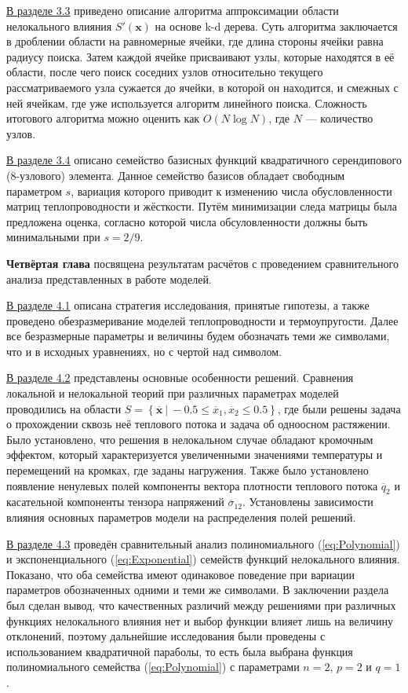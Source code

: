 \underline{В разделе 3.3} приведено описание алгоритма аппроксимации области нелокального влияния $S'(\boldsymbol{x})$ на основе k-d дерева. Суть алгоритма заключается в дроблении области на равномерные ячейки, где длина стороны ячейки равна радиусу поиска. Затем каждой ячейке присваивают узлы, которые находятся в её области, после чего поиск соседних узлов относительно текущего рассматриваемого узла сужается до ячейки, в которой он находится, и смежных с ней ячейкам, где уже используется алгоритм линейного поиска. Сложность итогового алгоритма можно оценить как $O(N \log N)$, где $N$ --- количество узлов.

\underline{В разделе 3.4} описано семейство базисных функций квадратичного серендипового (8-узлового) элемента. Данное семейство базисов обладает свободным параметром $s$, вариация которого приводит к изменению числа обусловленности матриц теплопроводности и жёсткости. Путём минимизации следа матрицы была предложена оценка, согласно которой числа обсуловленности должны быть минимальными при $s = 2/9$.

\textbf{Четвёртая глава} посвящена результатам расчётов с проведением сравнительного анализа представленных в работе моделей.

\underline{В разделе 4.1} описана стратегия исследования, принятые гипотезы, а также проведено обезразмеривание моделей теплопроводности и термоупругости. Далее все безразмерные параметры и величины будем обозначать теми же символами, что и в исходных уравнениях, но с чертой над символом.

\underline{В разделе 4.2} представлены основные особенности решений. Сравнения локальной и нелокальной теорий при различных параметрах моделей проводились на области $S = \left\{ \overline{\boldsymbol{x}} \ | \ -0.5 \leqslant \overline{x}_1, \overline{x}_2 \leqslant 0.5 \right\}$, где были решены задача о прохождении сквозь неё теплового потока и задача об одноосном растяжении. Было установлено, что решения в нелокальном случае обладают кромочным эффектом, который характеризуется увеличенными значениями температуры и перемещений на кромках, где заданы нагружения. Также было установлено появление ненулевых полей компоненты вектора плотности теплового потока $\overline{q}_2$ и касательной компоненты тензора напряжений $\overline{\sigma}_{12}$. Установлены зависимости влияния основных параметров модели на распределения полей решений.

\underline{В разделе 4.3} проведён сравнительный анализ полиномиального (\ref{eq:Polynomial}) и экспоненциального (\ref{eq:Exponential}) семейств функций нелокального влияния. Показано, что оба семейства имеют одинаковое поведение при вариации параметров обозначенных одними и теми же символами. В заключении раздела был сделан вывод, что качественных различий между решениями при различных функциях нелокального влияния нет и выбор функции влияет лишь на величину отклонений, поэтому дальнейшие исследования были проведены с использованием квадратичной параболы, то есть была выбрана функция полиномиального семейства (\ref{eq:Polynomial}) с параметрами $n = 2$, $p = 2$ и $q = 1$.

